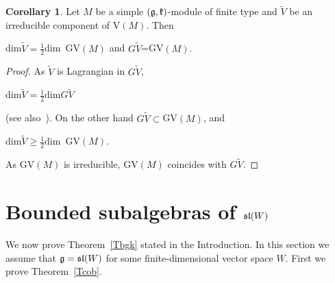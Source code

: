 \documentclass[12pt]{amsart}
\theoremstyle{definition}\newtheorem{theorem}{Theorem}[section]
\newtheorem{corollary}[proposition]{Corollary}
\theoremstyle{definition}\newtheorem{definition}[proposition]{Definition}
\theoremstyle{remark}\newtheorem{example}[proposition]{Example}
\begin{document}
\begin{corollary}\label{Cghol}Let $M$ be a simple $(\frak g, \frak k)$-module of finite type and $\tilde V$ be an irreducible component of V$(M)$. Then \begin{center}dim$\tilde V=\frac{1}{2}$dim~GV$(M)$ and $G\tilde V$=GV$(M)$.\end{center}\end{corollary}
\begin{proof}As $\tilde V$ is Lagrangian in $G\tilde V$, \begin{center}dim$\tilde V=\frac{1}{2}$dim$G\tilde V$\end{center} (see also~\cite{GL}). On the other hand $G\tilde V\subset$GV$(M)$, and \begin{center}dim$\tilde V\ge\frac{1}{2}$dim~GV$(M)$.\end{center} As GV$(M)$ is irreducible, GV$(M)$ coincides with $G\tilde V$.\end{proof}
\newpage\section{Bounded subalgebras of $\frak{sl}(W)$}\label{Sbgk}
We now prove Theorem~\ref{Tbgk} stated in the Introduction. In this
section we assume that $\frak g=\frak{sl}(W)$ for some
finite-dimensional vector space $W$. First we prove
Theorem~\ref{Tcob}.
\end{document}
